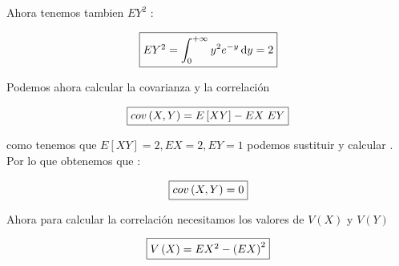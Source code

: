\documentclass[12pt]{article}
\begin{document}
    \begin{flushleft}
        Ahora tenemos tambien $EY^2$ :
    \end{flushleft}

    \begin{equation*}
        \fbox{$
            EY^2 = \displaystyle \int_{0}^{+\infty}  y^2 e^{-y} \,\mathrm{d}y  =  2
        $}
    \end{equation*}

    \vspace{1cm} 

    \begin{flushleft}
        Podemos ahora calcular la covarianza y la correlaci\'on 
    \end{flushleft}

    \begin{equation*}
        \fbox{$
            cov \left(X,Y\right) = E\left[XY\right] - EX \hspace{1mm}EY
        $}
    \end{equation*}

    \begin{flushleft}
        como tenemos que $E\left[XY\right] = 2 , EX =2  , EY=1 $ podemos sustituir y calcular . Por lo que obtenemos que : 
    \end{flushleft}

    \begin{equation*}
        \fbox{$
            cov \left(X,Y\right) = 0 
        $}
    \end{equation*}

    \begin{flushleft}
        Ahora para calcular la correlaci\'on necesitamos los valores de $V\left(X\right)$ y $V\left(Y\right)$
    \end{flushleft}

    \begin{equation*}
        \fbox{$
            V\left(X\right)  =  EX^2 - \left(EX\right)^2
        $}
    \end{equation*}
\end{document}
